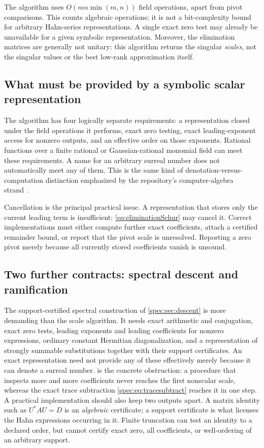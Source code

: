 \documentclass[11pt,a4paper]{article}
\numberwithin{equation}{section}
\theoremstyle{definition}
\theoremstyle{remark}
\begin{document}
The algorithm uses $O(mn\min(m,n))$ field operations, apart from pivot
comparisons. This counts algebraic operations; it is not a bit-complexity
bound for arbitrary Hahn-series representations. A
single exact zero test may already be unavailable for a given symbolic
representation. Moreover, the elimination matrices are generally not
unitary: this algorithm returns the singular \emph{scales}, not the singular
values or the best low-rank approximation itself.

\subsection{What must be provided by a symbolic scalar representation}
The algorithm has four logically separate requirements: a representation
closed under the field operations it performs, exact zero testing, exact
leading-exponent access for nonzero outputs, and an effective order on those
exponents. Rational functions over a finite rational or Gaussian-rational
monomial field can meet these requirements. A name for an arbitrary
surreal number does not automatically meet any of them. This is the same
kind of denotation-versus-computation distinction emphasized by the
repository's computer-algebra strand~\cite{RepoMap}.

Cancellation is the principal practical issue. A representation that stores
only the current leading term is insufficient: \eqref{eq:eliminationSchur}
may cancel it. Correct implementations must either compute further exact
coefficients, attach a certified remainder bound, or report that the pivot
scale is unresolved. Reporting a zero pivot merely because all currently
stored coefficients vanish is unsound.

\subsection{Two further contracts: spectral descent and ramification}
\label{spec:sec:contracts}
The support-certified spectral construction of \cref{spec:sec:descent} is
more demanding than the scale algorithm. It needs exact arithmetic and
conjugation, exact zero tests, leading exponents and leading coefficients
for nonzero expressions, ordinary constant Hermitian diagonalization, and a
representation of strongly summable substitutions together with their
support certificates. An exact representation need not provide any of these
effectively merely because it can denote a surreal number.
 is the concrete obstruction: a procedure that inspects
more and more coefficients never reaches the first nonscalar scale, whereas
the exact trace subtraction \eqref{spec:eq:tracesubtract} reaches it in one
step. A practical implementation should also keep two outputs apart. A
matrix identity such as $U^*AU=D$ is an \emph{algebraic} certificate; a
support certificate is what licenses the Hahn expressions occurring in it.
Finite truncation can test an identity to a declared order, but cannot
certify exact zero, all coefficients, or well-ordering of an arbitrary
support.
\end{document}
